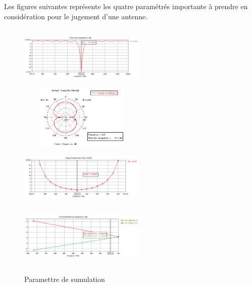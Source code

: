 \documentclass[11pt, a4paper, twoside]{book}
\begin{document}
Les figures suivantes représente les quatre paramétrés importante  à prendre en considération pour le jugement d'une antenne.
\begin{figure}[h]
\centering
\includegraphics[width=6cm,height=3cm]{clas11}
\includegraphics[width=6cm,height=3cm]{clapolfarfield}
\includegraphics[width=6cm,height=3cm]{clavswr}
\includegraphics[width=6cm,height=3cm]{claefficency}
\caption{Paramettre de sumulation}
\end{figure} 
\end{document}
